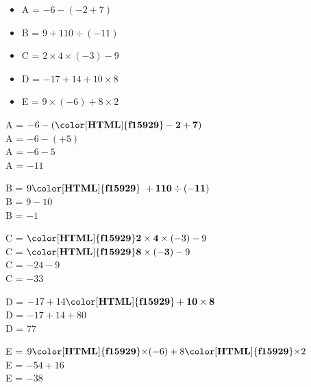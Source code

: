 \begin{exercice*}    
        \begin{itemize}
            \item[] A = $-6-(-2+7)$
            \item[] B = $9+110\div(-11)$
            \item[] C = $2\times4\times(-3)-9$
            \item[] D = $-17+14+10\times8$
            \item[] E = $9\times(-6)+8\times2$
        \end{itemize}
    
\end{exercice*}
\begin{corrige}
        \begin{list}{}{}
            \item A = $-6-(\mathbf{{\color[HTML]{f15929}-2+7}})$ \\
            A = $-6-(+5)$ \\
            A = $-6-5$ \\
            A = $-11$ \\
            \item B = $9\mathbf{{\color[HTML]{f15929}~+110\div(-11)}}$ \\
            B = $9-10$ \\
            B = $-1$ \\
            \item C = $\mathbf{{\color[HTML]{f15929}2\times4}}\times(-3)-9$ \\
            C = $\mathbf{{\color[HTML]{f15929}8\times(-3)}}-9$ \\
            C = $-24-9$ \\
            C = $-33$ \\
            \item D = $-17+14\mathbf{{\color[HTML]{f15929}+10\times8}}$ \\
            D = $-17+14+80$ \\
            D = $77$ \\
            \item E = $9\mathbf{{\color[HTML]{f15929}\times}}(-6)+8\mathbf{{\color[HTML]{f15929}\times}}2$ \\
            E = $-54+16$ \\
            E = $-38$ \\
        \end{list}
\end{corrige}
